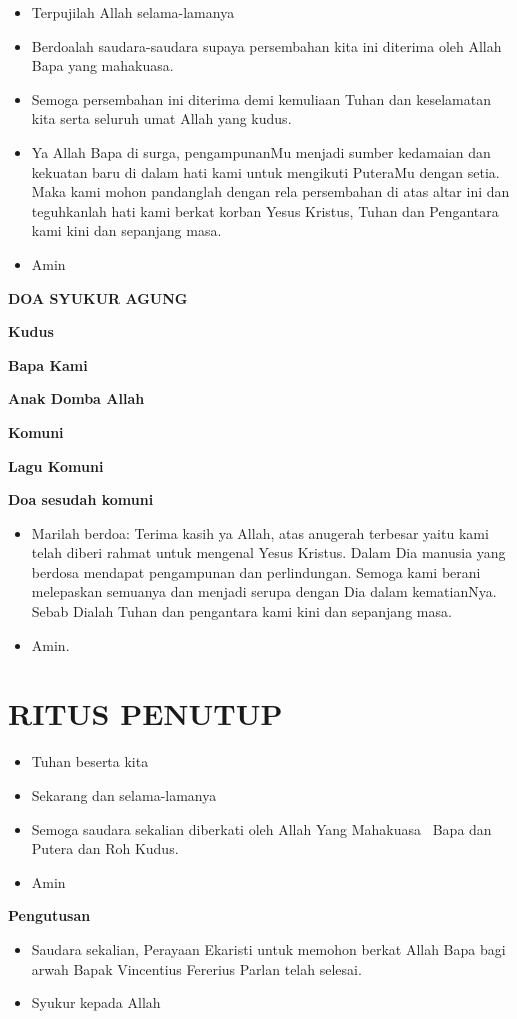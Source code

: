 \documentclass[titlepage,10pt,openany]{scrbook}
\makeatletter
\newcommand{\subjudul}[1]{%
  {\parindent \z@ 
    \interlinepenalty\@M \bfseries #1\par\nobreak \vskip 10\p@ }}
\newcommand{\BU}[1]{\begin{itemize} \item[U:] #1 \end{itemize}}
\newcommand{\BI}[1]{\begin{itemize} \item[I:] #1 \end{itemize}}
\newcommand{\namaalm}{Bapak Vincentius Fererius Parlan }
\makeatother
\begin{document}
\BU{Terpujilah Allah selama-lamanya}

\BI{Berdoalah saudara-saudara supaya persembahan kita ini 
diterima oleh Allah Bapa yang mahakuasa.}

\BU{Semoga persembahan ini diterima demi kemuliaan Tuhan 
dan keselamatan kita serta seluruh umat Allah yang kudus.}

\BI{Ya Allah Bapa di surga, pengampunanMu menjadi sumber 
kedamaian dan kekuatan baru di dalam hati kami untuk 
mengikuti PuteraMu dengan setia. Maka kami mohon 
pandanglah dengan rela persembahan di atas altar ini dan 
teguhkanlah hati kami berkat korban Yesus Kristus, Tuhan 
dan Pengantara kami kini dan sepanjang masa.}

\BU{Amin} 

\subjudul{DOA SYUKUR AGUNG}


\subjudul{Kudus}

\subjudul{Bapa Kami}

\subjudul{Anak Domba Allah}

\subjudul{Komuni}
\newpage
\subjudul{Lagu Komuni}
 

\subjudul{Doa sesudah komuni}

\BI{Marilah berdoa: Terima kasih ya Allah, atas anugerah 
terbesar yaitu kami telah diberi rahmat untuk mengenal 
Yesus Kristus. Dalam Dia manusia yang berdosa mendapat 
pengampunan dan perlindungan. Semoga kami berani 
melepaskan semuanya dan menjadi serupa dengan Dia 
dalam kematianNya. Sebab Dialah Tuhan dan pengantara 
kami kini dan sepanjang masa.}

\BU{Amin.}

 

\section*{RITUS PENUTUP}

\BI{Tuhan beserta kita}

\BU{Sekarang dan selama-lamanya}

\BI{Semoga saudara sekalian diberkati oleh Allah Yang 
Mahakuasa \Cross ~Bapa dan Putera dan Roh Kudus.}

\BU{Amin}

 

\subjudul{Pengutusan}

\BI{Saudara sekalian, Perayaan Ekaristi untuk memohon 
berkat Allah Bapa bagi arwah \namaalm telah selesai.}

\BU{Syukur kepada Allah}
\end{document}
